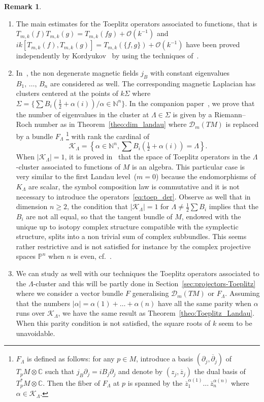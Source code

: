\documentclass[10pt,a4paper]{article}
\theoremstyle{definition}
\newtheorem{rema}[theo]{Remark}
\numberwithin{equation}{section}
\newcommand{\N}{{\mathbb{N}}}
\newcommand{\C}{{\mathbb{C}}}
\newcommand{\bbP}{\mathbb{P}}
\newcommand{\al}{{\alpha}}
\newcommand{\La}{{\Lambda}}
\newcommand{\Si}{{\Sigma}}
\newcommand{\con}{\overline}
\newcommand{\bigo}{\mathcal{O}}
\newcommand{\D}{\mathcal{D}}
\newcommand{\clK}{\mathcal{K}}
\begin{document}
\begin{rema}\leavevmode \label{sec:comp_Yuri}
\begin{enumerate}
\item\label{rema1.5.1}  The main estimates for the Toeplitz operators associated to functions, that is $T_{m,k} (f) T_{m,k} (g) = T_{m,k} (fg) + \bigo (k^{-1})$ and $ik [T_{m,k} (f), T_{m,k} (g)]= T_{m,k} (\{ f, g \}) + \bigo (k^{-1})$ have been proved independently by Kordyukov~\cite{Yuri_2} by using the techniques of~\cite{MaMa}.
\item \label{rema1.5.2} In~\cite{Yuri_2}, the non degenerate magnetic fields $j_B$ with constant eigenvalues $B_1,\, \ldots,\, B_n$ are considered as well. The corresponding magnetic Laplacian has clusters centered at the points of $k\Si$ where $\Si = \{ \sum B_i (\frac{1}{2} + \al (i)) / \al \in \N^n \}$. In the companion paper~\cite{oim_copain}, we prove that the number of eigenvalues in the cluster at $\La \in \Si$ is given by a Riemann--Roch number as in Theorem~\ref{theo:dim_landau} where $\D_m (TM)$ is replaced by a bundle $F_{\La}$ \footnote{$F_{\Lambda}$ is defined as follows: for any $p \in M$, introduce a basis $(\partial_j, \con{\partial}_j)$ of $T_pM \otimes \C$ such that $j_B
\partial_j = i B_j \partial_j$ and denote by $(z_j, \con{z}_j)$ the dual basis of $T^*_pM \otimes \C$. Then the fiber of $F_{\Lambda}$ at $p$ is spanned by the $\con{z}_1^{\al(1)}
\ldots\, \con{z}_n^{\al (n)}$ where $\al \in \clK_{\Lambda}$. } with rank the cardinal of
\[
\clK_{\La} = \left\{ \al \in \N^n, \sum B_i
\left(\tfrac{1}{2} + \al (i)\right) = \Lambda \right\}.
\]
When $|\clK_{\Lambda} | =1$, it is proved in~\cite{Yuri_2} that the space of Toeplitz operators in the $\Lambda$-cluster associated to functions of $M$ is an algebra. This particular case is very similar to the first Landau level~($m=0$) because the endomorphisms of $K_{\Lambda}$ are scalar, the symbol composition law is commutative and it is not necessary to introduce the operators~\eqref{eq:toep_der}. Observe as well that in dimension $n \geqslant 2$, the condition that $|\clK_{\Lambda}| =1$ for $\Lambda \neq \frac{1}{2} \sum B_i$ implies that the $B_i$ are not all equal, so that the tangent bundle of $M$, endowed with the unique up to isotopy complex structure compatible with the symplectic structure, splits into a non trivial sum of complex subbundles. This seems rather restrictive and is not satisfied for instance by the complex projective spaces $\bbP^n$ when $n$ is even, cf.~\cite{split}.

\item\label{rema1.5.3} We can study as well with our techniques the Toeplitz operators associated to the $\Lambda$-cluster and this will be partly done in Section~\ref{sec:projectors-Toeplitz} where we consider a vector bundle $F$ generalising $\D_m (TM)$ or $F_{\Lambda}$. Assuming that the numbers $|\al| = \al (1) + \ldots + \al (n)$ have all the same parity when $\al$ runs over $\clK_{\La}$, we have the same result as Theorem~\ref{theo:Toeplitz_Landau}. When this parity condition is not satisfied, the square roots of $k$ seem to be unavoidable.


\end{enumerate}
\end{rema}
\end{document}
